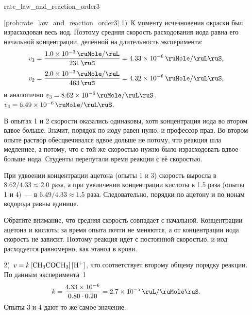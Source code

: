 \begin{problem}{}{rate_law_and_reaction_order3}
    \begin{sol}{\ref{prob:rate_law_and_reaction_order3}}
        1)~К моменту исчезновения окраски был израсходован весь иод. Поэтому средняя скорость расходования иода равна его начальной концентрации, делённой на длительность эксперимента:
        \begin{equation*}
            v_1 = \frac{\qty{1,0e-3}{\ruMole\per\ruL}}{\qty{231}{\ruS}} = \qty{4,33e-6}{\ruMole\per\ruL\ruS},
        \end{equation*}
        \begin{equation*}
            v_2 = \frac{\qty{2,0e-3}{\ruMole\per\ruL}}{\qty{463}{\ruS}} = \qty{4,32e-6}{\ruMole\per\ruL\ruS},
        \end{equation*}
        и аналогично $v_3 = \qty{8,62e-6}{\ruMole\per\ruL\ruS}$, $v_4 = \qty{6,49e-6}{\ruMole\per\ruL\ruS}$.

        В опытах 1 и 2 скорости оказались одинаковы, хотя концентрация иода во втором вдвое больше. Значит, порядок по иоду равен нулю, и профессор прав. Во втором опыте раствор обесцвечивался вдвое дольше не потому, что реакция шла медленнее, а потому, что с той же скоростью нужно было израсходовать вдвое больше иода. Студенты перепутали время реакции с её скоростью.

        При удвоении концентрации ацетона (опыты 1 и 3) скорость выросла в $\num{8,62}/\num{4,33} \approx \num{2,0}$ раза, а при увеличении концентрации кислоты в \num{1,5} раза (опыты 1 и 4)~--- в $\num{6,49}/\num{4,33} \approx \num{1,5}$ раза. Следовательно, порядки по ацетону и по ионам водорода равны единице.

        Обратите внимание, что средняя скорость совпадает с начальной. Концентрации ацетона и кислоты за время опыта почти не меняются, а от концентрации иода скорость не зависит. Поэтому реакция идёт с постоянной скоростью, и иод расходуется равномерно, как этанол в крови.

        2)~$v = k\,[\ce{CH3COCH3}]\,[\ce{H^+}]$, что соответствует второму общему порядку реакции. По данным эксперимента~1
        \begin{equation*}
            k = \frac{\num{4,33e-6}}{\num{0,80} \cdot \num{0,20}} = \qty{2,7e-5}{\ruL\per\ruMole\ruS}.
        \end{equation*}
        Опыты 3 и 4 дают то же самое значение.


\end{sol}
\end{problem}
